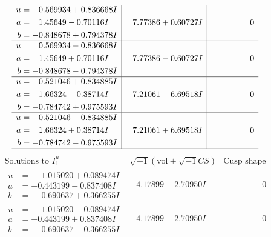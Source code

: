 \documentclass[1p]{elsarticle_modified}
\theoremstyle{definition}
\newcommand{\I}{\sqrt{-1}}
\begin{document}
$$\begin{array}{c|c|c}
\begin{aligned}
u &= \phantom{-}0.569934 + 0.836668 I \\
a &= \phantom{-}1.45649 - 0.70116 I \\
b &= -0.848678 + 0.794378 I\end{aligned}
 & \phantom{-}7.77386 + 0.60727 I & \phantom{-0.000000 } 0 \\ \hline\begin{aligned}
u &= \phantom{-}0.569934 - 0.836668 I \\
a &= \phantom{-}1.45649 + 0.70116 I \\
b &= -0.848678 - 0.794378 I\end{aligned}
 & \phantom{-}7.77386 - 0.60727 I & \phantom{-0.000000 } 0 \\ \hline\begin{aligned}
u &= -0.521046 + 0.834885 I \\
a &= \phantom{-}1.66324 - 0.38714 I \\
b &= -0.784742 + 0.975593 I\end{aligned}
 & \phantom{-}7.21061 - 6.69518 I & \phantom{-0.000000 } 0 \\ \hline\begin{aligned}
u &= -0.521046 - 0.834885 I \\
a &= \phantom{-}1.66324 + 0.38714 I \\
b &= -0.784742 - 0.975593 I\end{aligned}
 & \phantom{-}7.21061 + 6.69518 I & \phantom{-0.000000 } 0\\
 \hline 
 \end{array}$$\newpage$$\begin{array}{c|c|c}  
\text{Solutions to }I^u_{1}& \I (\text{vol} + \sqrt{-1}CS) & \text{Cusp shape}\\
 \hline 
\begin{aligned}
u &= \phantom{-}1.015020 + 0.089474 I \\
a &= -0.443199 - 0.837408 I \\
b &= \phantom{-}0.690637 + 0.366255 I\end{aligned}
 & -4.17899 + 2.70950 I & \phantom{-0.000000 } 0 \\ \hline\begin{aligned}
u &= \phantom{-}1.015020 - 0.089474 I \\
a &= -0.443199 + 0.837408 I \\
b &= \phantom{-}0.690637 - 0.366255 I\end{aligned}
 & -4.17899 - 2.70950 I & \phantom{-0.000000 } 0 \\ \hline\begin{aligned}

\end{aligned}
\end{array}$$
\end{document}
